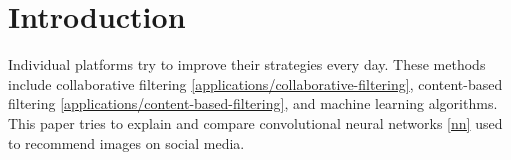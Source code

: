\section{Introduction} \label{introduction}

Individual platforms try to improve their strategies every day. These methods include collaborative filtering \ref{applications/collaborative-filtering}, content-based filtering \ref{applications/content-based-filtering}, and machine learning algorithms.\cite{10142790} This paper tries to explain and compare convolutional neural networks \ref{nn} used to recommend images on social media.


